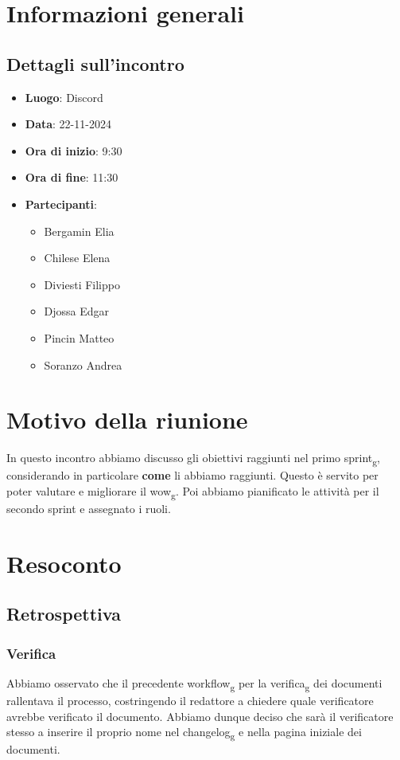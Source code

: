 \section{Informazioni generali}
    \subsection{Dettagli sull'incontro}
        \begin{itemize}
            \item \textbf{Luogo}: Discord
            \item \textbf{Data}: 22-11-2024
            \item \textbf{Ora di inizio}: 9:30
            \item \textbf{Ora di fine}: 11:30
            \item \textbf{Partecipanti}:
                \begin{itemize}
                    \item Bergamin Elia
                    \item Chilese Elena
                    \item Diviesti Filippo
                    \item Djossa Edgar
                    \item Pincin Matteo
                    \item Soranzo Andrea
                \end{itemize}
        \end{itemize}

\section{Motivo della riunione}
    In questo incontro abbiamo discusso gli obiettivi raggiunti nel primo sprint\textsubscript{g},
    considerando in particolare \textbf{come} li abbiamo raggiunti. Questo è
    servito per poter valutare e migliorare il wow\textsubscript{g}. Poi abbiamo
    pianificato le attività per il secondo sprint e assegnato i ruoli.
\section{Resoconto}
    \subsection{Retrospettiva}
        \subsubsection{Verifica}
            Abbiamo osservato che il precedente workflow\textsubscript{g} per la verifica\textsubscript{g}
            dei documenti rallentava il processo, costringendo il redattore a chiedere quale verificatore avrebbe verificato il
            documento. Abbiamo dunque deciso che sarà il verificatore stesso a inserire il
            proprio nome nel changelog\textsubscript{g} e nella pagina iniziale dei documenti.
